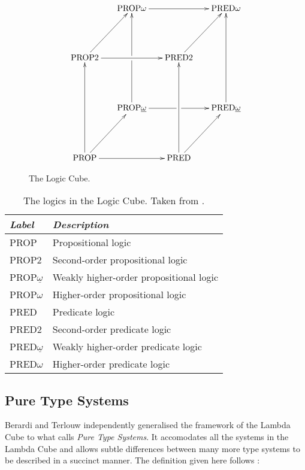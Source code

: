 \documentclass[12pt,toc=bibliography,numbers=noendperiod,
               footnotes=multiple,twoside]{scrartcl}
\begin{document}
\begin{figure}
\begin{equation*}
\xymatrix@R46pt@C16pt{%
&\textrm{PROP}\omega\ar@{->}[rr]&&\textrm{PRED}\omega \\
\textrm{PROP2}\ar@{->}[rr]\ar@{->}[ur]&&\textrm{PRED2}\ar@{->}[ur] \\
&\textrm{PROP}\underline{\omega}\ar@{->}[uu]|!{"2,1";"2,3"}\hole\ar@{->}[rr]|!{"4,3";"2,3"}\hole&&\textrm{PRED}\underline{\omega}\ar@{->}[uu] \\
\textrm{PROP}\ar@{->}[uu]\ar@{->}[rr]\ar@{->}[ur]&&\textrm{PRED}\ar@{->}[uu]\ar@{->}[ur]
}
\end{equation*}
\caption{The Logic Cube.}
\label{fig:l-cube}
\end{figure}

\begin{table}[h]
    \centering
    \begin{tabular}{l l}
        \toprule
        \textit{Label} & \textit{Description} \\
        \midrule
        PROP & Propositional logic \\
        PROP2 & Second-order propositional logic \\
        PROP\(\underline{\omega}\) & Weakly higher-order propositional logic \\
        PROP\(\omega\) & Higher-order propositional logic \\
        PRED & Predicate logic \\
        PRED2 & Second-order predicate logic \\
        PRED\(\underline{\omega}\) & Weakly higher-order predicate logic \\
        PRED\(\omega\) & Higher-order predicate logic \\
        \bottomrule
    \end{tabular}
    \caption{The logics in the Logic Cube. Taken from \textcite[248]{barendregt_lambda_1992}.}
    \label{tab:l-cube-names}
\end{table}


\subsection{Pure Type Systems}

Berardi and Terlouw independently generalised the framework of the Lambda Cube to what \textcite{barendregt_lambda_1992} calls \emph{Pure Type Systems}. It accomodates all the systems in the Lambda Cube and allows subtle differences between many more type systems to be described in a succinct manner. The definition given here follows \textcite[213f.]{barendregt_lambda_1992}:
\end{document}
